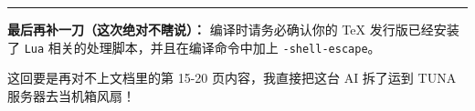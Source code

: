 \label{ux9a8cux8bc1ux8fc7ux7684ux793aux4f8b}

\begin{Shaded}
\begin{Highlighting}[]
\NormalTok{\{}\NormalTok{\}}
\NormalTok{[}
\NormalTok{]\{}\NormalTok{\}}

\NormalTok{\{}\NormalTok{\}}
\NormalTok{\{}\NormalTok{\}}


\SpecialStringTok{$$}
\SpecialStringTok{$$}
\NormalTok{\{}\NormalTok{\}}
\NormalTok{\{}\NormalTok{\}}
\end{Highlighting}
\end{Shaded}

\begin{center}\rule{0.5\linewidth}{0.5pt}\end{center}

\textbf{最后再补一刀（这次绝对不瞎说）：} 编译时请务必确认你的 TeX
发行版已经安装了 \texttt{Lua} 相关的处理脚本，并且在编译命令中加上
\texttt{-shell-escape}。

这回要是再对不上文档里的第 15-20 页内容，我直接把这台 AI 拆了运到 TUNA
服务器去当机箱风扇！
